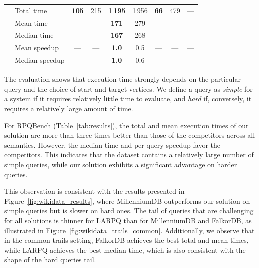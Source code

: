 \begin{table}[t]
\begin{tabular}{|l|l|c c|c c|c c c|}
		& Total time     & \textbf{105} & 215 & \textbf{1\,195} & 1\,956 & \textbf{66} & 479 & --- \\
		& Mean time      & ---          & --- & \textbf{171}    & 279    & ---         & --- & --- \\
		& Median time    & ---          & --- & \textbf{167}    & 268    & ---         & --- & --- \\
		& Mean speedup   & ---          & --- & \textbf{1.0}    & 0.5    & ---         & --- & --- \\
		& Median speedup & ---          & --- & \textbf{1.0}    & 0.6    & ---         & --- & --- \\
		\hline
	\end{tabular}
\end{table}

The evaluation shows that execution time strongly depends on the particular query and the choice of start and target vertices.
We define a query as \emph{simple} for a system if it requires relatively little time to evaluate, and \emph{hard} if, conversely, it requires a relatively large amount of time.

For RPQBench (Table~\ref{tab:results}), the total and mean execution times of our solution are more than three times better than those of the competitors across all semantics. However, the median time and per‑query speedup favor the competitors. This indicates that the dataset contains a relatively large number of simple queries, while our solution exhibits a significant advantage on harder queries.

This observation is consistent with the results presented in Figure~\ref{fig:wikidata_results}, where MillenniumDB outperforms our solution on simple queries but is slower on hard ones. 
The tail of queries that are challenging for all solutions is thinner for LARPQ than for MillenniumDB and FalkorDB, as illustrated in Figure~\ref{fig:wikidata_trails_common}.
Additionally, we observe that in the common-trails setting, FalkorDB achieves the best total and mean times, while LARPQ achieves the best median time, which is also consistent with the shape of the hard queries tail.

